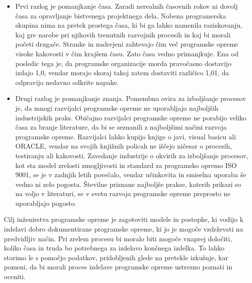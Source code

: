 \documentclass[a4paper,12pt,openright]{book}
\begin{document}
\begin{itemize}
    \item Prvi razlog je pomanjkanje časa. Zaradi nerealnih časovnih rokov ni dovolj časa za opravljanje bistvenega projektnega dela. Nobena programerska skupina nima na pretek prostega časa, ki bi ga lahko namenila raziskovanju, kaj gre narobe pri njihovih trenutnih razvojnih procesih in kaj bi morali početi drugače. Stranke in nadrejeni zahtevajo čim več programske opreme visoke kakovosti v čim krajšem času. Zato časa vedno primanjkuje. Ena od posledic tega je, da programske organizacije morda pravočasno dostavijo izdajo 1,0, vendar morajo skoraj takoj zatem dostaviti različico 1,01, da odpravijo nedavno odkrite napake.
    \item Drugi razlog je pomanjkanje znanja. Pomembna ovira za izboljšanje procesov je, da mnogi razvijalci programske opreme ne uporabljajo najboljših industrijskih praks. Običajno razvijalci programske opreme ne porabijo veliko časa za branje literature, da bi se seznanili z najboljšimi načini razvoja programske opreme. Razvijalci lahko kupijo knjige o javi, visual basicu ali ORACLE, vendar na svojih knjižnih policah ne iščejo ničesar o procesih, testiranju ali kakovosti.
Zavedanje industrije o okvirih za izboljšanje procesov, kot sta model zrelosti zmogljivosti in  standard za programsko opremo ISO 9001, se je v zadnjih letih povečalo, vendar učinkovita in smiselna uporaba še vedno ni zelo pogosta. Številne priznane najboljše prakse, katerih prikazi so na voljo v literaturi, se v svetu razvoja programske opreme preprosto ne uporabljajo pogosto. \cite{aggarwal2005software}
\end{itemize}
Cilj inženirstva programske opreme je zagotoviti modele in postopke, ki vodijo k izdelavi dobro dokumentirane programske opreme, ki jo je mogoče vzdrževati na predvidljiv način. Pri zrelem procesu bi moralo biti mogoče vnaprej določiti, koliko časa in truda bo potrebnega za izdelavo končnega izdelka. To lahko storimo le s pomočjo podatkov, pridobljenih glede na pretekle izkušnje, kar pomeni, da bi morali proces izdelave programske opreme ustrezno poznati in oceniti. 
\end{document}

